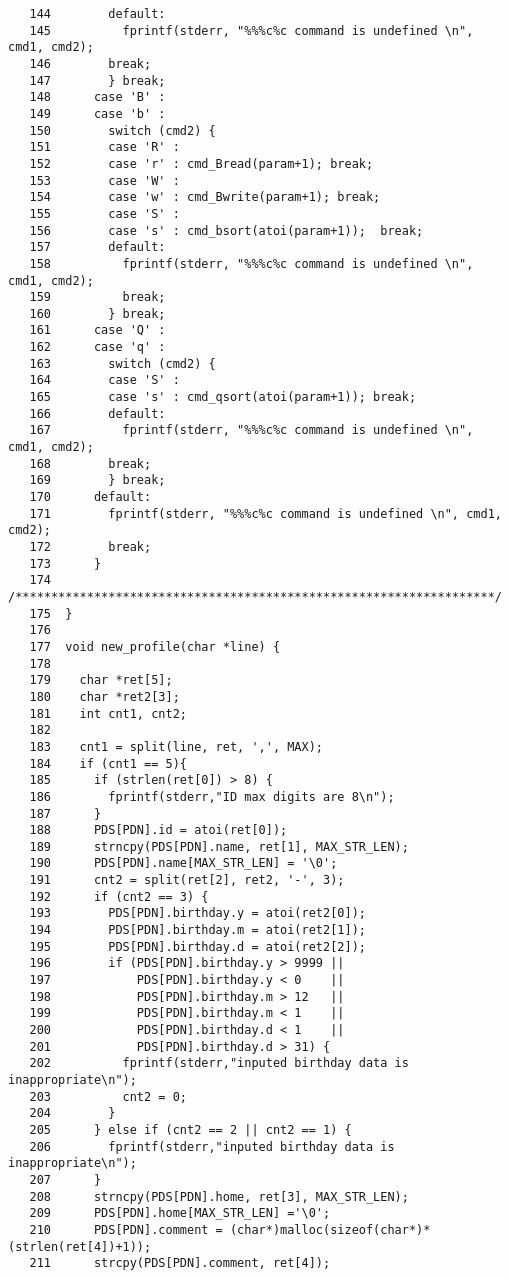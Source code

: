 \documentclass[a4paper,11pt]{jarticle}
\begin{document}
{\begin{verbatim}
   144        default:
   145          fprintf(stderr, "%%%c%c command is undefined \n", cmd1, cmd2);
   146        break;
   147        } break;      
   148      case 'B' :
   149      case 'b' :
   150        switch (cmd2) {
   151        case 'R' : 
   152        case 'r' : cmd_Bread(param+1); break;
   153        case 'W' : 
   154        case 'w' : cmd_Bwrite(param+1); break;
   155        case 'S' : 
   156        case 's' : cmd_bsort(atoi(param+1));  break;  
   157        default:
   158          fprintf(stderr, "%%%c%c command is undefined \n", cmd1, cmd2);
   159          break;  
   160        } break;
   161      case 'Q' :
   162      case 'q' :
   163        switch (cmd2) {
   164        case 'S' : 
   165        case 's' : cmd_qsort(atoi(param+1)); break;
   166        default:
   167          fprintf(stderr, "%%%c%c command is undefined \n", cmd1, cmd2);
   168        break; 
   169        } break;
   170      default:
   171        fprintf(stderr, "%%%c%c command is undefined \n", cmd1, cmd2);
   172        break;
   173      }   
   174      /*******************************************************************/
   175  }
   176    
   177  void new_profile(char *line) {
   178      
   179    char *ret[5];
   180    char *ret2[3];
   181    int cnt1, cnt2;
   182    
   183    cnt1 = split(line, ret, ',', MAX);
   184    if (cnt1 == 5){
   185      if (strlen(ret[0]) > 8) {
   186        fprintf(stderr,"ID max digits are 8\n");
   187      }
   188      PDS[PDN].id = atoi(ret[0]);
   189      strncpy(PDS[PDN].name, ret[1], MAX_STR_LEN);
   190      PDS[PDN].name[MAX_STR_LEN] = '\0';
   191      cnt2 = split(ret[2], ret2, '-', 3);
   192      if (cnt2 == 3) { 
   193        PDS[PDN].birthday.y = atoi(ret2[0]);
   194        PDS[PDN].birthday.m = atoi(ret2[1]);
   195        PDS[PDN].birthday.d = atoi(ret2[2]);
   196        if (PDS[PDN].birthday.y > 9999 ||
   197            PDS[PDN].birthday.y < 0    ||
   198            PDS[PDN].birthday.m > 12   ||
   199            PDS[PDN].birthday.m < 1    ||
   200            PDS[PDN].birthday.d < 1    ||
   201            PDS[PDN].birthday.d > 31) {
   202          fprintf(stderr,"inputed birthday data is inappropriate\n");
   203          cnt2 = 0;
   204        }
   205      } else if (cnt2 == 2 || cnt2 == 1) {
   206        fprintf(stderr,"inputed birthday data is inappropriate\n");
   207      } 
   208      strncpy(PDS[PDN].home, ret[3], MAX_STR_LEN);
   209      PDS[PDN].home[MAX_STR_LEN] ='\0';
   210      PDS[PDN].comment = (char*)malloc(sizeof(char*)*(strlen(ret[4])+1));
   211      strcpy(PDS[PDN].comment, ret[4]);

\end{verbatim}}
\end{document}
